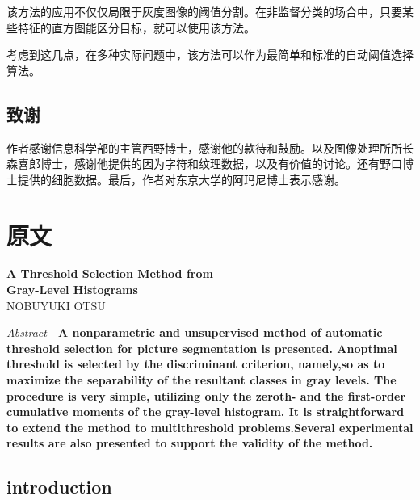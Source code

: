 该方法的应用不仅仅局限于灰度图像的阈值分割。在非监督分类的场合中，只要某些特征的直方图能区分目标，就可以使用该方法。

考虑到这几点，在多种实际问题中，该方法可以作为最简单和标准的自动阈值选择算法。

\subsection*{致谢}

作者感谢信息科学部的主管西野博士，感谢他的款待和鼓励。以及图像处理所所长森喜郎博士，感谢他提供的因为字符和纹理数据，以及有价值的讨论。还有野口博士提供的细胞数据。最后，作者对东京大学的阿玛尼博士表示感谢。


\section*{原文}

\begin{center}
 \Large \textbf{A Threshold Selection Method from \\ Gray-Level Histograms}\\[10pt]
\normalsize NOBUYUKI OTSU\\[10pt]
\end{center}

\textit{Abstract}---\textbf{A nonparametric and unsupervised method of automatic threshold selection for picture segmentation is presented. Anoptimal threshold is selected by the discriminant criterion, namely,so as to maximize the separability of the resultant classes in gray levels. The procedure is very simple, utilizing only the zeroth- and the first-order cumulative moments of the gray-level histogram. It is straightforward to extend the method to multithreshold problems.Several experimental results are also presented to support the validity of the method.}

\subsection*{introduction}

